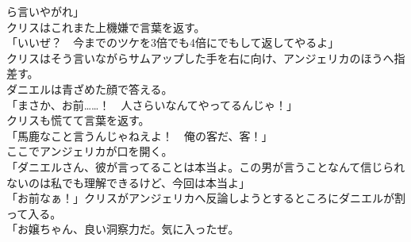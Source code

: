 \documentclass[b5j,10pt,openany]{jsbook}
\begin{document}
ら言いやがれ」\\クリスはこれまた上機嫌で言葉を返す。\\「いいぜ？　今までのツケを3倍でも4倍にでもして返してやるよ」\\クリスはそう言いながらサムアップした手を右に向け、アンジェリカのほうへ指差す。\\ダニエルは青ざめた顔で答える。\\「まさか、お前\ldots{}\ldots{}！　人さらいなんてやってるんじゃ！」\\クリスも慌てて言葉を返す。\\「馬鹿なこと言うんじゃねえよ！　俺の客だ、客！」\\ここでアンジェリカが口を開く。\\「ダニエルさん、彼が言ってることは本当よ。この男が言うことなんて信じられないのは私でも理解できるけど、今回は本当よ」\\「お前なぁ！」クリスがアンジェリカへ反論しようとするところにダニエルが割って入る。\\「お嬢ちゃん、良い洞察力だ。気に入ったぜ。
\end{document}
